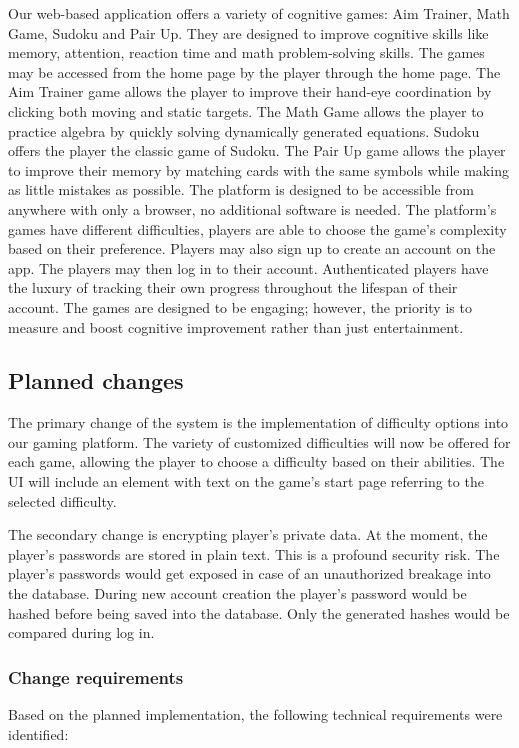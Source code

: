 \documentclass[11pt,a4paper]{article}
\begin{document}
Our web-based application offers a variety of cognitive games: Aim Trainer, Math Game, Sudoku and Pair Up. They are designed to improve cognitive skills like memory, attention, reaction time and math problem-solving skills. The games may be accessed from the home page by the player through the home page. The Aim Trainer game allows the player to improve their hand-eye coordination by clicking both moving and static targets. The Math Game allows the player to practice algebra by quickly solving dynamically generated equations. Sudoku offers the player the classic game of Sudoku. The Pair Up game allows the player to improve their memory by matching cards with the same symbols while making as little mistakes as possible. The platform is designed to be  accessible from anywhere with only a browser, no additional software is needed. The platform's games have different difficulties, players are able to choose the game's complexity based on their preference. Players may also sign up to create an account on the app. The players may then log in to their account. Authenticated players have the luxury of tracking their own progress throughout the lifespan of their account. The games are designed to be engaging; however, the priority is to measure and boost cognitive improvement rather than just entertainment.


\subsection{Planned changes}
The primary change of the system is the implementation of difficulty options into our gaming platform. The variety of customized difficulties will now be offered for each game, allowing the player to choose a difficulty based on their abilities. The UI will include an element with text on the game's start page referring to the selected difficulty. 

The secondary change is encrypting player's private data. At the moment, the player's passwords are stored in plain text. This is a profound security risk. The player's passwords would get exposed in case of an unauthorized breakage into the database. During new account creation the player's password would be hashed before being saved into the database. Only the generated hashes would be compared during log in.

\subsubsection{Change requirements}
Based on the planned implementation, the following technical requirements were identified:
\end{document}

